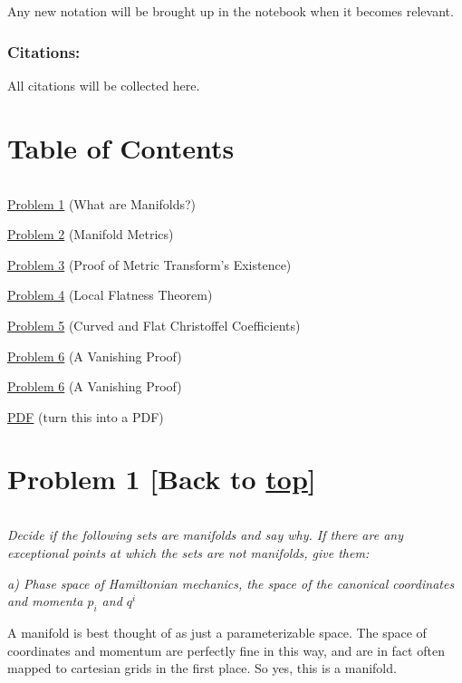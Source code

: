 \documentclass[landscape,letterpaper,10pt,english]{article}
\begin{document}
Any new notation will be brought up in the notebook when it becomes
relevant.

\hypertarget{citations}{%
\subsubsection{Citations:}\label{citations}}

All citations will be collected here.

    \hypertarget{table-of-contents}{%
\section{Table of Contents}\label{table-of-contents}}

\[\label{toc}\]

\hyperref[p1]{Problem 1} (What are Manifolds?)

\hyperref[p2]{Problem 2} (Manifold Metrics)

\hyperref[p3]{Problem 3} (Proof of Metric Transform's Existence)

\hyperref[p4]{Problem 4} (Local Flatness Theorem)

\hyperref[p5]{Problem 5} (Curved and Flat Christoffel Coefficients)

\hyperref[p6]{Problem 6} (A Vanishing Proof)

\hyperref[p6]{Problem 6} (A Vanishing Proof)

\hyperref[latex_pdf_output]{PDF} (turn this into a PDF)

    \hypertarget{problem-1-back-to-top}{%
\section{\texorpdfstring{Problem 1 {[}Back to
\hyperref[toc]{top}{]}}{Problem 1 {[}Back to {]}}}\label{problem-1-back-to-top}}

\[\label{P1}\]

\emph{Decide if the following sets are manifolds and say why. If there
are any exceptional points at which the sets are not manifolds, give
them:}

\emph{a) Phase space of Hamiltonian mechanics, the space of the
canonical coordinates and momenta \(p_i\) and \(q^i\)}

    A manifold is best thought of as just a parameterizable space. The space
of coordinates and momentum are perfectly fine in this way, and are in
fact often mapped to cartesian grids in the first place. So yes, this is
a manifold.
\end{document}
